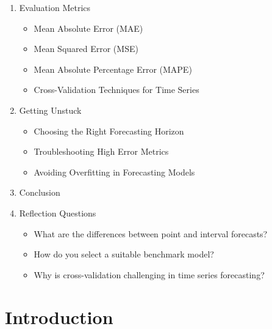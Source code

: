 \begin{enumerate}
\begin{itemize}
\end{itemize}

\item Evaluation Metrics

\begin{itemize}

\item Mean Absolute Error (MAE)

\item Mean Squared Error (MSE)

\item Mean Absolute Percentage Error (MAPE)

\item Cross-Validation Techniques for Time Series

\end{itemize}

\item Getting Unstuck

\begin{itemize}

\item Choosing the Right Forecasting Horizon

\item Troubleshooting High Error Metrics

\item Avoiding Overfitting in Forecasting Models

\end{itemize}

\item Conclusion

\item Reflection Questions

\begin{itemize}

\item What are the differences between point and interval forecasts?

\item How do you select a suitable benchmark model?

\item Why is cross-validation challenging in time series forecasting?

\end{itemize}

\end{enumerate}



\section{Introduction}

